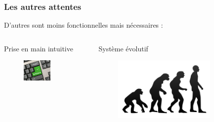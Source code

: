 \begin{frame}


  \frametitle{Les autres attentes}
  \large D'autres sont moins fonctionnelles mais nécessaires :
\bigskip
  \begin{columns}[t]
    \begin{column}{0.5\textwidth}

      \centering \normalsize Prise en main intuitive
      \begin{figure}[!h]
        \bigskip
        \begin{center}
          \includegraphics[width = 0.6\textwidth]{presentation/solution.jpg}
        \end{center}
      \end{figure}
    \end{column}
    \begin{column}{0.5\textwidth}
      \centering \normalsize Système évolutif
      \begin{figure}[!h]
        \bigskip
        \begin{center}
          \includegraphics[width = 0.8\textwidth]{presentation/evolution.png}
        \end{center}
      \end{figure}

    \end{column}
    
  \end{columns}
\end{frame}